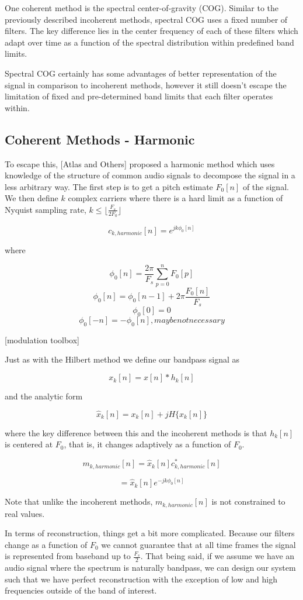 \documentclass [11pt, proquest] {uwthesis}[2015/03/03]
\begin{document}
One coherent method is the spectral center-of-gravity (COG).  Similar to the previously described incoherent methods, spectral COG uses a fixed number of filters.  The key difference lies in the center frequency of each of these filters which adapt over time as a function of the spectral distribution within predefined band limits.

Spectral COG certainly has some advantages of better representation of the signal in comparison to incoherent methods, however it still doesn't escape the limitation of fixed and pre-determined band limits that each filter operates within.

\subsection{Coherent Methods - Harmonic}

To escape this, [Atlas and Others] proposed a harmonic method which uses knowledge of the structure of common audio signals to decompose the signal in a less arbitrary way.  The first step is to get a pitch estimate $F_0[n]$ of the signal.  We then define $k$ complex carriers where there is a hard limit as a function of Nyquist sampling rate, $k \leq  \lfloor \frac{F_s}{2F_0} \rfloor$

$$c_{k,harmonic}[n] = e^{jk\phi_0 [n]}$$

where 

$$\phi_0[n] = \frac{2\pi}{F_s} \sum_{p=0}^{n} F_0[p]$$
$$\phi_0[n] = \phi_0[n - 1] + 2\pi \frac{F_0[n]}{F_s}$$
$$\phi_0[0] = 0$$
$$\phi_0[-n] = -\phi_0[n], maybe not necessary$$

[modulation toolbox]

Just as with the Hilbert method we define our bandpass signal as 

$$x_k[n] = x[n] * h_k[n]$$

and the analytic form

$$\widehat{x}_k[n] = x_k[n] + jH\{x_k[n]\}$$

where the key difference between this and the incoherent methods is that $h_k[n]$ is centered at $F_0$, that is, it changes adaptively as a function of $F_0$.

$$m_{k,harmonic}[n] = \widehat{x}_k[n] c_{k,harmonic}^*[n] $$

$$= \widehat{x}_k[n] e^{-jk \phi_0[n]}$$

Note that unlike the incoherent methods, $m_{k,harmonic}[n]$ is not constrained to real values.

In terms of reconstruction, things get a bit more complicated.  Because our filters change as a function of $F_0$ we cannot guarantee that at all time frames the signal is represented from baseband up to $\frac{F_s}{2}$.  That being said, if we assume we have an audio signal where the spectrum is naturally bandpass, we can design our system such that we have perfect reconstruction with the exception of low and high frequencies outside of the band of interest.
\end{document}
